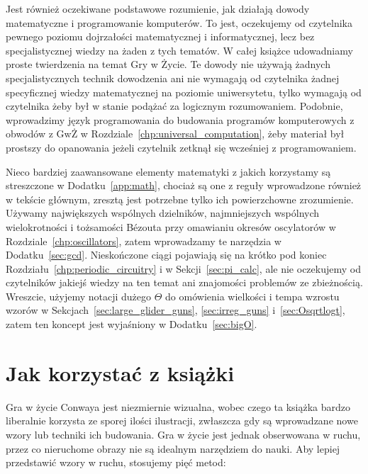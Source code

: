 Jest również oczekiwane podstawowe rozumienie, jak działają dowody matematyczne i programowanie komputerów. To jest, oczekujemy od czytelnika pewnego poziomu dojrzałości matematycznej i informatycznej, lecz bez specjalistycznej wiedzy na żaden z tych tematów. W całej książce udowadniamy proste twierdzenia na temat Gry w Życie. Te dowody nie używają żadnych specjalistycznych technik dowodzenia ani nie wymagają od czytelnika żadnej specyficznej wiedzy matematycznej na poziomie uniwersytetu, tylko wymagają od czytelnika żeby był w stanie podążać za logicznym rozumowaniem. Podobnie, wprowadzimy język programowania do budowania programów komputerowych z obwodów z GwŻ w Rozdziale~\ref{chp:universal_computation}, żeby materiał był prostszy do opanowania jeżeli czytelnik zetknął się wcześniej z programowaniem.

Nieco bardziej zaawansowane elementy matematyki z jakich korzystamy są streszczone w Dodatku~\ref{app:math}, chociaż są one z reguły wprowadzone również w tekście głównym, zresztą jest potrzebne tylko ich powierzchowne zrozumienie. Używamy największych wspólnych dzielników, najmniejszych wspólnych wielokrotności i tożsamości B\'ezouta przy omawianiu okresów oscylatorów w Rozdziale~\ref{chp:oscillators}, zatem wprowadzamy te narzędzia w Dodatku~\ref{sec:gcd}. Nieskończone ciągi pojawiają się na krótko pod koniec Rozdziału~\ref{chp:periodic_circuitry} i w Sekcji~\ref{sec:pi_calc}, ale nie oczekujemy od czytelników jakiejś wiedzy na ten temat ani znajomości problemów ze zbieżnością. Wreszcie, użyjemy notacji dużego $\Theta$ do omówienia wielkości i tempa wzrostu wzorów w Sekcjach~\ref{sec:large_glider_guns}, \ref{sec:irreg_guns} i~\ref{sec:Osqrtlogt}, zatem ten koncept jest wyjaśniony w Dodatku~\ref{sec:bigO}.


\section*{Jak korzystać z książki}

Gra w życie Conwaya jest niezmiernie wizualna, wobec czego ta książka bardzo liberalnie korzysta ze sporej ilości ilustracji, zwłaszcza gdy są wprowadzane nowe wzory lub techniki ich budowania. Gra w życie jest jednak obserwowana w ruchu, przez co nieruchome obrazy nie są idealnym narzędziem do nauki. Aby lepiej przedstawić wzory w ruchu, stosujemy pięć metod:\medskip

